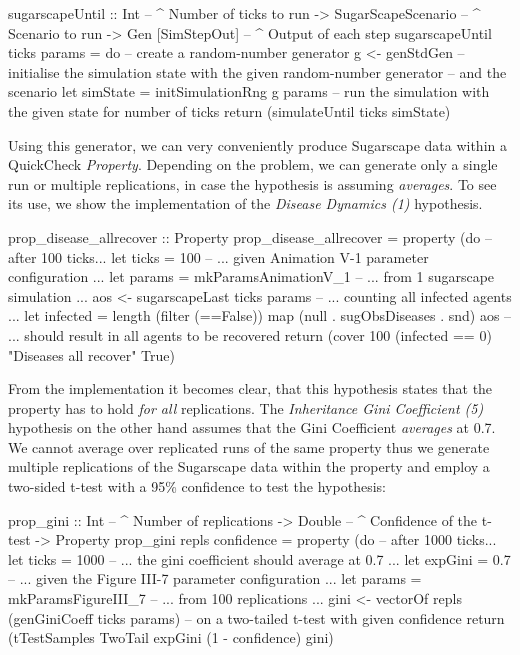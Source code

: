 \begin{HaskellCode}
sugarscapeUntil :: Int                -- ^ Number of ticks to run
                -> SugarScapeScenario -- ^ Scenario to run
                -> Gen [SimStepOut]   -- ^ Output of each step
sugarscapeUntil ticks params = do
  -- create a random-number generator
  g <- genStdGen
  -- initialise the simulation state with the given random-number generator
  -- and the scenario
  let simState = initSimulationRng g params
  -- run the simulation with the given state for number of ticks
  return (simulateUntil ticks simState)
\end{HaskellCode}

Using this generator, we can very conveniently produce Sugarscape data within a QuickCheck \textit{Property}. Depending on the problem, we can generate only a single run or multiple replications, in case the hypothesis is assuming \textit{averages}. To see its use, we show the implementation of the \textit{Disease Dynamics (1)} hypothesis.

\begin{HaskellCode}
prop_disease_allrecover :: Property
prop_disease_allrecover = property (do
  -- after 100 ticks...
  let ticks = 100
  -- ... given Animation V-1 parameter configuration ...
  let params = mkParamsAnimationV_1
  -- ... from 1 sugarscape simulation ...
  aos <- sugarscapeLast ticks params
  -- ... counting all infected agents ...
  let infected = length (filter (==False)) map (null . sugObsDiseases . snd) aos
  -- ... should result in all agents to be recovered
  return (cover 100 (infected == 0) "Diseases all recover" True)
\end{HaskellCode}

From the implementation it becomes clear, that this hypothesis states that the property has to hold \textit{for all} replications. The \textit{Inheritance Gini Coefficient (5)} hypothesis on the other hand assumes that the Gini Coefficient \textit{averages} at 0.7. We cannot average over replicated runs of the same property thus we generate multiple replications of the Sugarscape data within the property and employ a two-sided t-test with a 95\% confidence to test the hypothesis:

\begin{HaskellCode}
prop_gini :: Int      -- ^ Number of replications
          -> Double   -- ^ Confidence of the t-test
          -> Property
prop_gini repls confidence = property (do
  -- after 1000 ticks...
  let ticks = 1000
  -- ... the gini coefficient should average at 0.7 ...
  let expGini = 0.7
  -- ... given the Figure III-7 parameter configuration ...
  let params = mkParamsFigureIII_7
  -- ... from 100 replications ... 
  gini <- vectorOf repls (genGiniCoeff ticks params)
  -- on a two-tailed t-test with given confidence
  return (tTestSamples TwoTail expGini (1 - confidence) gini)
\end{HaskellCode}

